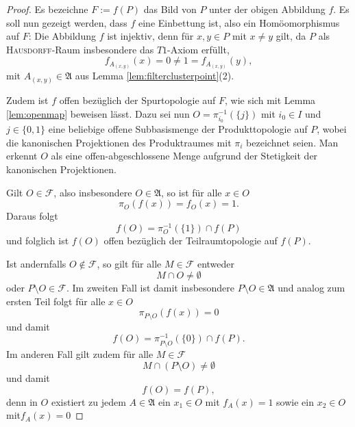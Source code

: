 \begin{proof}
  Es bezeichne $F := f(P)$ das Bild von $P$ unter der obigen Abbildung $f$.
  Es soll nun gezeigt werden, dass $f$ eine Einbettung ist, also ein Homöomorphismus auf $F$:
  Die Abbildung $f$ ist injektiv, denn für $x,y \in P$ mit $x \neq y$ gilt, da $P$ als \textsc{Hausdorff}-Raum insbesondere das $T1$-Axiom erfüllt,
  \begin{displaymath}
    f_{A_{(x,y)}}(x) = 0 \neq 1 = f_{A_{(x,y)}}(y),
  \end{displaymath}
  mit $A_{(x,y)} \in \mathfrak{A}$ aus Lemma \ref{lem:filterclusterpoint}(2).

  Zudem ist $f$ offen bezüglich der Spurtopologie auf $F$, wie sich mit Lemma \ref{lem:openmap} beweisen lässt. 
  Dazu sei nun $O = \pi_{i_0}^{-1}(\{j\})$ mit $i_0 \in I$ und $j \in \{0,1\}$ eine beliebige offene Subbasismenge der Produkttopologie auf $P$,  wobei die kanonischen Projektionen des Produktraumes mit $\pi_i$ bezeichnet seien.
  Man erkennt $O$ als eine offen-abgeschlossene Menge aufgrund der Stetigkeit der kanonischen Projektionen.

  Gilt $O \in \mathcal{F}$, also insbesondere $O \in \mathfrak{A}$, so ist für alle $x \in O$
  \begin{displaymath}
    \pi_O(f(x)) = f_O(x) = 1.
  \end{displaymath}
  Daraus folgt 
  \begin{displaymath}
    f(O) = \pi_O^{-1}(\{1\}) \cap f(P)
  \end{displaymath}
  und folglich ist $f(O)$ offen bezüglich der Teilraumtopologie auf $f(P)$.

  Ist andernfalls $O \not\in \mathcal{F}$, so gilt für alle $M \in \mathcal{F}$ entweder
  \begin{displaymath}
    M \cap O \neq \emptyset
  \end{displaymath}
  oder $P \setminus O \in \mathcal{F}$.
  Im zweiten Fall ist damit insbesondere $P \setminus O \in \mathfrak{A}$ und analog zum ersten Teil folgt für alle $x \in O$
  \begin{displaymath}
    \pi_{P \setminus O}(f(x)) = 0
  \end{displaymath}
  und damit 
  \begin{displaymath}
    f(O) = \pi_{P \setminus O}^{-1}(\{0\}) \cap f(P).
  \end{displaymath}
  Im anderen Fall gilt zudem für alle $M \in \mathcal{F}$
  \begin{displaymath}
    M \cap (P \setminus O) \neq \emptyset
  \end{displaymath}
  und damit 
  \begin{displaymath}
    f(O) = f(P),
  \end{displaymath}
  denn in $O$ existiert zu jedem $A \in \mathfrak{A}$ ein $x_1 \in O$ mit $f_A(x) = 1$ sowie ein $x_2 \in O$ mit$f_A(x) = 0$


\end{proof}
